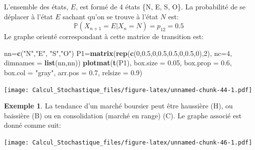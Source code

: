 \documentclass[
]{book}
\newenvironment{Shaded}{\begin{snugshade}}{\end{snugshade}}
\newcommand{\DataTypeTok}[1]{\textcolor[rgb]{0.13,0.29,0.53}{#1}}
\newcommand{\DecValTok}[1]{\textcolor[rgb]{0.00,0.00,0.81}{#1}}
\newcommand{\FloatTok}[1]{\textcolor[rgb]{0.00,0.00,0.81}{#1}}
\newcommand{\KeywordTok}[1]{\textcolor[rgb]{0.13,0.29,0.53}{\textbf{#1}}}
\newcommand{\NormalTok}[1]{#1}
\newcommand{\StringTok}[1]{\textcolor[rgb]{0.31,0.60,0.02}{#1}}
\theoremstyle{definition}
\theoremstyle{definition}
\newtheorem{example}{Exemple}[chapter]
\theoremstyle{definition}
\theoremstyle{remark}
\begin{document}
L'ensemble des états, \(E\), est formé de 4 états \{N, E, S, O\}. La probabilité de se déplacer à l'état \(E\) sachant qu'on se trouve à l'état \(N\) est:
\[
\mathbb{P}(X_{n+1}=E|X_n=N)=p_{12}=0.5
\]
Le graphe orienté correspondant à cette matrice de transition est:

\begin{Shaded}
\begin{Highlighting}[]
\NormalTok{nn=}\KeywordTok{c}\NormalTok{(}\StringTok{"N"}\NormalTok{,}\StringTok{"E"}\NormalTok{, }\StringTok{"S"}\NormalTok{,}\StringTok{"O"}\NormalTok{)}
\NormalTok{P1=}\KeywordTok{matrix}\NormalTok{(}\KeywordTok{rep}\NormalTok{(}\KeywordTok{c}\NormalTok{(}\DecValTok{0}\NormalTok{,}\FloatTok{0.5}\NormalTok{,}\DecValTok{0}\NormalTok{,}\FloatTok{0.5}\NormalTok{,}\FloatTok{0.5}\NormalTok{,}\DecValTok{0}\NormalTok{,}\FloatTok{0.5}\NormalTok{,}\DecValTok{0}\NormalTok{),}\DecValTok{2}\NormalTok{), }\DataTypeTok{nc=}\DecValTok{4}\NormalTok{,}
          \DataTypeTok{dimnames =} \KeywordTok{list}\NormalTok{(nn,nn))}
\KeywordTok{plotmat}\NormalTok{(}\KeywordTok{t}\NormalTok{(P1), }\DataTypeTok{box.size =} \FloatTok{0.05}\NormalTok{, }\DataTypeTok{box.prop =} \FloatTok{0.6}\NormalTok{, }\DataTypeTok{box.col =} \StringTok{"gray"}\NormalTok{, }
          \DataTypeTok{arr.pos =} \FloatTok{0.7}\NormalTok{, }\DataTypeTok{relsize =} \FloatTok{0.9}\NormalTok{)}
\end{Highlighting}
\end{Shaded}

\texttt{[image: Calcul\_Stochastique\_files/figure-latex/unnamed-chunk-44-1.pdf]}
\begin{example}
\protect\hypertarget{exm:unnamed-chunk-45}{}{\label{exm:unnamed-chunk-45} }La tendance d'un marché boursier peut être haussière (H), ou baissière (B) ou en consolidation (marché en range) (C). Le graphe associé est donné comme suit:
\end{example}
\texttt{[image: Calcul\_Stochastique\_files/figure-latex/unnamed-chunk-46-1.pdf]}
\end{document}
